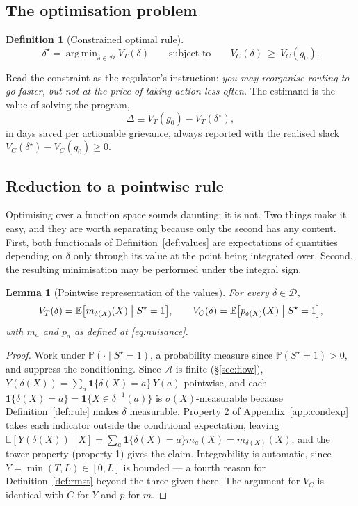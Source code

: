 \documentclass[11pt,a4paper]{article}
\theoremstyle{plain}
\newtheorem{lemma}[theorem]{Lemma}
\theoremstyle{definition}
\newtheorem{definition}[theorem]{Definition}
\theoremstyle{remark}
\DeclareMathOperator*{\argmin}{arg\,min}
\newcommand{\E}{\mathbb E}
\newcommand{\Prob}{\mathbb P}
\newcommand{\one}[1]{\mathbf 1\{#1\}}
\newcommand{\Sstar}{S^{\star}}
\begin{document}
\subsection{The optimisation problem}

\begin{definition}[Constrained optimal rule]\label{def:optimal}
\begin{equation}
\delta^\star=\argmin_{\delta\in\mathcal D}V_T(\delta)
\qquad\text{subject to}\qquad
V_C(\delta)\ \ge\ V_C(g_0).
\label{eq:program}
\end{equation}
\end{definition}

Read the constraint as the regulator's instruction: \emph{you may reorganise routing to go
faster, but not at the price of taking action less often.} The estimand is the value of solving
the program,
\begin{equation}
\Delta\equiv V_T(g_0)-V_T(\delta^\star),
\label{eq:Delta}
\end{equation}
in days saved per actionable grievance, always reported with the realised slack
$V_C(\delta^\star)-V_C(g_0)\ge0$.

\subsection{Reduction to a pointwise rule}\label{sec:pointwise}

Optimising over a function space sounds daunting; it is not. Two things make it easy, and they
are worth separating because only the second has any content. First, both functionals of
Definition~\ref{def:values} are expectations of quantities depending on $\delta$ only through its
value at the point being integrated over. Second, the resulting minimisation may be performed
under the integral sign.

\begin{lemma}[Pointwise representation of the values]\label{lem:pointwise-value}
For every $\delta\in\mathcal D$,
\[
V_T(\delta)=\E\bigl[m_{\delta(X)}(X)\bigm|\Sstar=1\bigr],
\qquad
V_C(\delta)=\E\bigl[p_{\delta(X)}(X)\bigm|\Sstar=1\bigr],
\]
with $m_a$ and $p_a$ as defined at \eqref{eq:nuisance}.
\end{lemma}

\begin{proof}
Work under $\Prob(\cdot\mid \Sstar=1)$, a probability measure since
$\Prob(\Sstar=1)>0$, and suppress the conditioning. Since $\mathcal A$ is finite
(\S\ref{sec:flow}),
$Y(\delta(X))=\sum_{a}\one{\delta(X)=a}\,Y(a)$ pointwise, and each
$\one{\delta(X)=a}=\one{X\in\delta^{-1}(a)}$ is $\sigma(X)$-measurable because
Definition~\ref{def:rule} makes $\delta$ measurable. Property 2 of Appendix~\ref{app:condexp}
takes each indicator outside the conditional expectation, leaving
$\E[Y(\delta(X))\mid X]=\sum_a\one{\delta(X)=a}m_a(X)=m_{\delta(X)}(X)$, and the tower property
(property 1) gives the claim. Integrability is automatic, since $Y=\min(T,L)\in[0,L]$ is bounded
--- a fourth reason for Definition~\ref{def:rmst} beyond the three given there. The argument for
$V_C$ is identical with $C$ for $Y$ and $p$ for $m$.
\end{proof}
\end{document}
